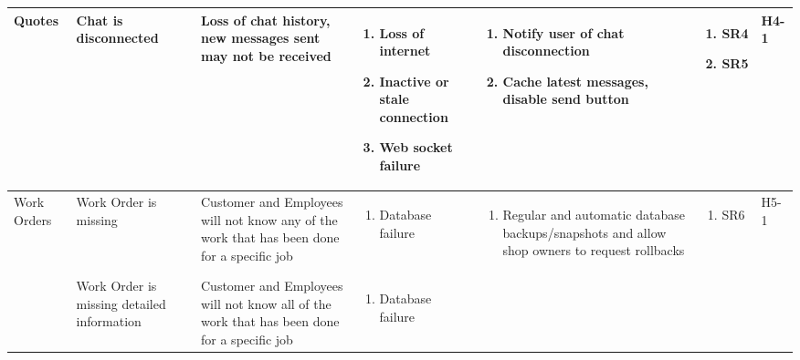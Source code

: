 \documentclass{article}
\begin{document}
\begin{landscape}
\begin{longtable}{|p{}|p{}|p{}|p{}|p{}|p{}|p{}|}
		\hline
		Quotes
		 & Chat is disconnected
		 & Loss of chat history, new messages sent may not be received
		 & \begin{enumerate}[label=\alph*., leftmargin=*]
			   \item Loss of internet
			   \item Inactive or stale connection
			   \item Web socket failure
		   \end{enumerate}
		 & \begin{enumerate}[label=\alph*., leftmargin=*]
			   \item Notify user of chat disconnection
			   \item Cache latest messages, disable send button
		   \end{enumerate}
		 & \begin{enumerate}[label=\alph*., leftmargin=*]
			   \item SR4
			   \item SR5
		   \end{enumerate}
		 & H4-1                                                                                                         \\
		\hline
		\multirow{2}{*}{Work Orders}
		 & Work Order is missing
		 & Customer and Employees will not know any of the work that has been done for a specific job
		 & \begin{enumerate}[label=\alph*., leftmargin=*]
			   \item Database failure
		   \end{enumerate}
		 & \begin{enumerate}[label=\alph*., leftmargin=*]
			   \item Regular and automatic database backups/snapshots and allow shop owners to request rollbacks
		   \end{enumerate}
		 & \begin{enumerate}[label=\alph*., leftmargin=*]
			   \item SR6
		   \end{enumerate}
		 & H5-1                                                                                                         \\
		\cline{2-7}
		~
		 & Work Order is missing detailed information
		 & Customer and Employees will not know all of the work that has been done for a specific job
		 & \begin{enumerate}[label=\alph*., leftmargin=*]
			   \item Database failure

\end{enumerate}
\end{longtable}
\end{landscape}
\end{document}
